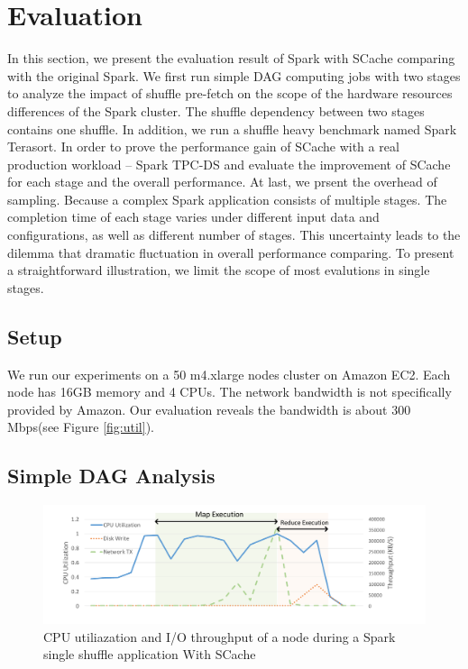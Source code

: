 \section{Evaluation}\label{evaluation}

In this section, we present the evaluation result of Spark with SCache comparing with the original Spark. We first run simple DAG computing jobs with two stages to analyze the impact of shuffle pre-fetch on the scope of the hardware resources differences of the Spark cluster. The shuffle dependency between two stages contains one shuffle. In addition, we run a shuffle heavy benchmark named Spark Terasort\cite{spark-tera}. In order to prove the performance gain of SCache with a real production workload -- Spark TPC-DS\cite{sparktpcds} and evaluate the improvement of SCache for each stage and the overall performance. At last, we prsent the overhead of sampling. Because a complex Spark application consists of multiple stages. The completion time of each stage varies under different input data and configurations, as well as different number of stages. This uncertainty leads to the dilemma that dramatic fluctuation in overall performance comparing. To present a straightforward illustration, we limit the scope of most evalutions in single stages. 

\subsection{Setup}\label{stepup}
We run our experiments on a 50 m4.xlarge nodes cluster on Amazon EC2\cite{aws}. Each node has 16GB memory and 4 CPUs. The network bandwidth is not specifically provided by Amazon. Our evaluation reveals the bandwidth is about 300 Mbps(see Figure \ref{fig:util}).

\subsection{Simple DAG Analysis}

\begin{figure}
	\includegraphics[width=\textwidth]{fig/scache_util}
	\caption{CPU utiliazation and I/O throughput of a node during a Spark single shuffle application With SCache}
	\label{fig:scache_util}
\end{figure}

